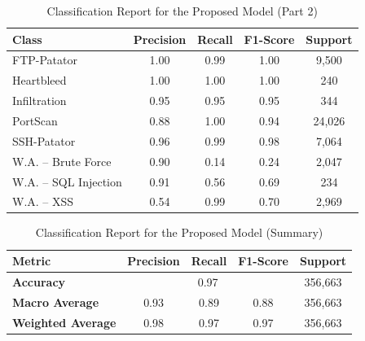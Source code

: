 \documentclass[conference]{IEEEtran}
\begin{document}
\begin{table}[!ht]
\centering
\caption{Classification Report for the Proposed Model (Part 2)}
\label{tab:classification_report_part2}
\begin{tabular}{|l|c|c|c|c|}
\hline
\textbf{Class}                   & \textbf{Precision} & \textbf{Recall} & \textbf{F1-Score} & \textbf{Support} \\ \hline
FTP-Patator                      & 1.00               & 0.99            & 1.00              & 9,500            \\ \hline
Heartbleed                       & 1.00               & 1.00            & 1.00              & 240              \\ \hline
Infiltration                     & 0.95               & 0.95            & 0.95              & 344              \\ \hline
PortScan                         & 0.88               & 1.00            & 0.94              & 24,026           \\ \hline
SSH-Patator                      & 0.96               & 0.99            & 0.98              & 7,064            \\ \hline
W.A. – Brute Force         & 0.90               & 0.14            & 0.24              & 2,047            \\ \hline
W.A. – SQL Injection       & 0.91               & 0.56            & 0.69              & 234              \\ \hline
W.A. – XSS                 & 0.54               & 0.99            & 0.70              & 2,969            \\ \hline
\end{tabular}
\end{table}

\begin{table}[!ht]
\centering
\caption{Classification Report for the Proposed Model (Summary)}
\label{tab:classification_report_summary}
\begin{tabular}{|l|c|c|c|c|}
\hline
\textbf{Metric}                  & \textbf{Precision} & \textbf{Recall} & \textbf{F1-Score} & \textbf{Support} \\ \hline
\textbf{Accuracy}                & \multicolumn{3}{c|}{0.97}            & 356,663          \\ \hline
\textbf{Macro Average}           & 0.93               & 0.89            & 0.88              & 356,663          \\ \hline
\textbf{Weighted Average}        & 0.98               & 0.97            & 0.97              & 356,663          \\ \hline
\end{tabular}
\end{table}
\end{document}
